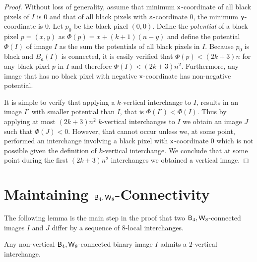 \documentclass[lotsofwhite,charterfonts]{patmorin}
\newcommand{\foureight}{\ensuremath{\protect\textup{\textsf{B}}_{4},\protect\textup{\textsf{W}}_{8}}}
\newcommand{\x}{\ensuremath{\protect\textup{\textsf{x}}}}
\newcommand{\y}{\ensuremath{\protect\textup{\textsf{y}}}}
\begin{document}
\begin{proof} 

Without loss of generality, assume that minimum \x-coordinate of all
black pixels of $I$ is 0 and that of all black pixels with
\x-coordinate 0, the minimum \y-coordinate is 0.  Let $p_0$ be the
black pixel $(0,0)$. Define the \emph{potential} of a black pixel
$p=(x,y)$ as $\Phi(p)=x +(k+1)(n-y)$ and define the potential
$\Phi(I)$ of image $I$ as the sum the potentials of all black pixels
in $I$.  Because $p_0$ is black and $B_a(I)$ is connected, it is
easily verified that $\Phi(p)< (2k+3)n$ for any black pixel $p$ in $I$
and therefore $\Phi(I)< (2k+3)n^2$. Furthermore, any image that has no
black pixel with negative \x-coordinate has non-negative potential.

It is simple to verify that applying a $k$-vertical interchange to
$I$, results in an image $I'$ with smaller potential than $I$, that is
$\Phi(I')<\Phi(I)$. Thus by applying at most $(2k+3)n^2$ $k$-vertical
interchanges to $I$ we obtain an image $J$ such that $\Phi(J)< 0$.
However, that cannot occur unless we, at some point, performed an
interchange involving a black pixel with \x-coordinate $0$ which is
not possible given the definition of $k$-vertical interchange.  We
conclude that at some point during the first $(2k+3)n^2$ interchanges
we obtained a vertical image.
\end{proof}



\section{Maintaining $\foureight$-Connectivity}


The following lemma is the main step in the proof that two
\foureight-connected images $I$ and $J$ differ by a sequence of
$8$-local interchanges.  

\begin{lem}
Any non-vertical $\foureight$-connected binary image $I$ admits a $2$-vertical interchange.
\end{lem}
\end{document}
